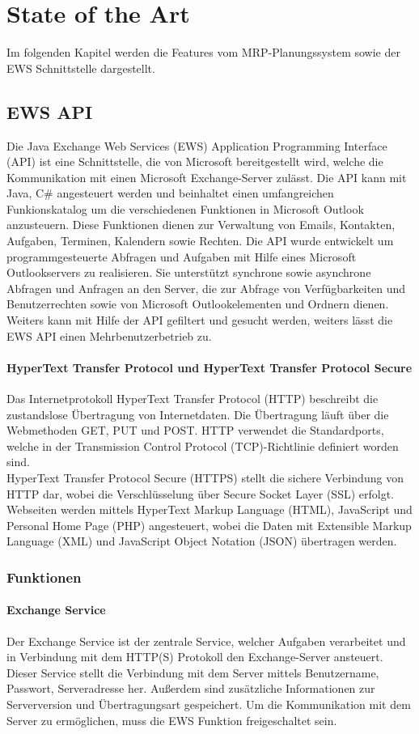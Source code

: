 \chapter{State of the Art}
Im folgenden Kapitel werden die Features vom MRP-Planungssystem sowie der EWS Schnittstelle dargestellt.

\section{EWS API}
Die Java Exchange Web Services (EWS) Application Programming Interface (API) ist eine Schnittstelle, die von Microsoft bereitgestellt wird, welche die Kommunikation mit einen Microsoft Exchange-Server zulässt. Die API kann mit Java, C\# angesteuert werden und beinhaltet einen umfangreichen Funkionskatalog um die verschiedenen Funktionen in Microsoft Outlook anzusteuern. Diese Funktionen dienen zur Verwaltung von Emails, Kontakten, Aufgaben, Terminen, Kalendern sowie Rechten. Die API wurde entwickelt um programmgesteuerte Abfragen und Aufgaben mit Hilfe eines Microsoft Outlookservers zu realisieren. Sie unterstützt synchrone sowie asynchrone Abfragen und Anfragen an den Server, die zur Abfrage von Verfügbarkeiten und Benutzerrechten sowie von Microsoft Outlookelementen und Ordnern dienen. Weiters kann mit Hilfe der API gefiltert und gesucht werden, weiters lässt die EWS API einen Mehrbenutzerbetrieb zu.\cite{ews2016}
\subsubsection{HyperText Transfer Protocol und HyperText Transfer Protocol Secure}
Das Internetprotokoll HyperText Transfer Protocol (HTTP) beschreibt die zustandslose Übertragung von Internetdaten. Die Übertragung läuft über die Webmethoden GET, PUT und POST. HTTP verwendet die Standardports, welche in der Transmission Control Protocol (TCP)-Richtlinie definiert worden sind.\\ HyperText Transfer Protocol Secure (HTTPS) stellt die sichere Verbindung von HTTP dar, wobei die Verschlüsselung über Secure Socket Layer (SSL) erfolgt. Webseiten werden mittels HyperText Markup Language (HTML), JavaScript und Personal Home Page (PHP) angesteuert, wobei die Daten mit Extensible Markup Language (XML) und JavaScript Object Notation (JSON) übertragen werden.\cite{ews2016,w3c}
\subsection{Funktionen}
\subsubsection{Exchange Service}
Der Exchange Service ist der zentrale Service, welcher Aufgaben verarbeitet und in Verbindung mit dem HTTP(S) Protokoll den Exchange-Server ansteuert. Dieser Service stellt die Verbindung mit dem Server mittels Benutzername, Passwort, Serveradresse her. Außerdem sind zusätzliche Informationen zur Serverversion und Übertragungsart gespeichert. Um die Kommunikation mit dem Server zu ermöglichen, muss die EWS Funktion freigeschaltet sein.\cite{ews2016}
